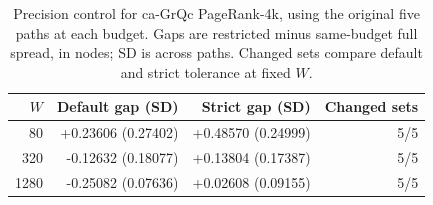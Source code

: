 \begin{table}[htbp]
\caption{Precision control for ca-GrQc PageRank-4k, using the original five paths at each budget. Gaps are restricted minus same-budget full spread, in nodes; SD is across paths. Changed sets compare default and strict tolerance at fixed $W$.}\label{tab:precision-output}
\centering\begin{tabular}{rrrr}\toprule
$W$ & Default gap (SD) & Strict gap (SD) & Changed sets \\ \midrule
80 & +0.23606 (0.27402) & +0.48570 (0.24999) & 5/5 \\
320 & -0.12632 (0.18077) & +0.13804 (0.17387) & 5/5 \\
1280 & -0.25082 (0.07636) & +0.02608 (0.09155) & 5/5 \\
\bottomrule\end{tabular}
\end{table}